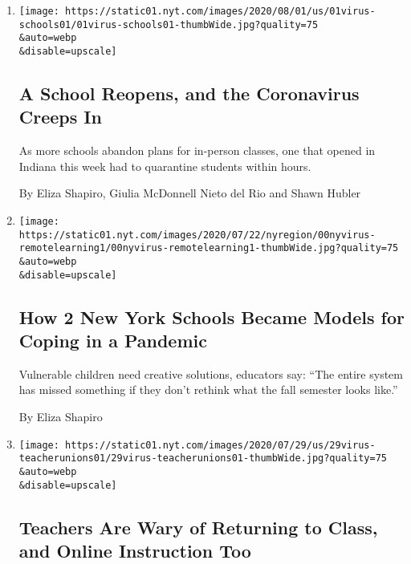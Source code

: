 \begin{enumerate}
\def\labelenumi{\arabic{enumi}.}
\item
  \href{/2020/08/01/us/schools-reopening-indiana-coronavirus.html}{}

  \texttt{[image: https://static01.nyt.com/images/2020/08/01/us/01virus-schools01/01virus-schools01-thumbWide.jpg?quality=75\\\&auto=webp\\\&disable=upscale]}

  \hypertarget{a-school-reopens-and-the-coronavirus-creeps-in}{%
  \subsection{A School Reopens, and the Coronavirus Creeps
  In}\label{a-school-reopens-and-the-coronavirus-creeps-in}}

  As more schools abandon plans for in-person classes, one that opened
  in Indiana this week had to quarantine students within hours.

  By Eliza Shapiro, Giulia McDonnell Nieto del Rio and Shawn Hubler
\item
  \href{/2020/07/31/nyregion/nyc-homeless-children-school.html}{}

  \texttt{[image: https://static01.nyt.com/images/2020/07/22/nyregion/00nyvirus-remotelearning1/00nyvirus-remotelearning1-thumbWide.jpg?quality=75\\\&auto=webp\\\&disable=upscale]}

  \hypertarget{how-2-new-york-schools-became-models-for-coping-in-a-pandemic}{%
  \subsection{How 2 New York Schools Became Models for Coping in a
  Pandemic}\label{how-2-new-york-schools-became-models-for-coping-in-a-pandemic}}

  Vulnerable children need creative solutions, educators say: ``The
  entire system has missed something if they don't rethink what the fall
  semester looks like.''

  By Eliza Shapiro
\item
  \href{/2020/07/29/us/teacher-union-school-reopening-coronavirus.html}{}

  \texttt{[image: https://static01.nyt.com/images/2020/07/29/us/29virus-teacherunions01/29virus-teacherunions01-thumbWide.jpg?quality=75\\\&auto=webp\\\&disable=upscale]}

  \hypertarget{teachers-are-wary-of-returning-to-class-and-online-instruction-too}{%
  \subsection{Teachers Are Wary of Returning to Class, and Online
  Instruction
  Too}\label{teachers-are-wary-of-returning-to-class-and-online-instruction-too}}


\end{enumerate}
